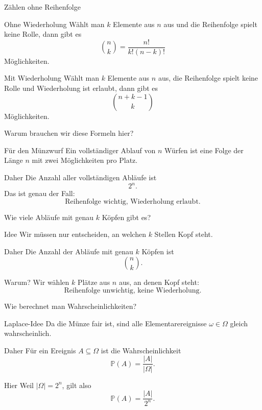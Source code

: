 \documentclass{beamer}
\begin{document}
\begin{frame}{Zählen ohne Reihenfolge}
\begin{block}{Ohne Wiederholung}
Wählt man \(k\) Elemente aus \(n\) aus und die Reihenfolge spielt keine Rolle, dann gibt es
\[
\binom{n}{k}=\frac{n!}{k!(n-k)!}
\]
Möglichkeiten.
\end{block}

\begin{block}{Mit Wiederholung}
Wählt man \(k\) Elemente aus \(n\) aus, die Reihenfolge spielt keine Rolle und Wiederholung ist erlaubt, dann gibt es
\[
\binom{n+k-1}{k}
\]
Möglichkeiten.
\end{block}
\end{frame}

\begin{frame}{Warum brauchen wir diese Formeln hier?}
\begin{block}{Für den Münzwurf}
Ein vollständiger Ablauf von \(n\) Würfen ist eine Folge der Länge \(n\) mit zwei Möglichkeiten pro Platz.
\end{block}

\begin{block}{Daher}
Die Anzahl aller vollständigen Abläufe ist
\[
2^n.
\]
Das ist genau der Fall:
\[
\text{Reihenfolge wichtig, Wiederholung erlaubt.}
\]
\end{block}
\end{frame}

\begin{frame}{Wie viele Abläufe mit genau \(k\) Köpfen gibt es?}
\begin{block}{Idee}
Wir müssen nur entscheiden, an welchen \(k\) Stellen Kopf steht.
\end{block}

\begin{block}{Daher}
Die Anzahl der Abläufe mit genau \(k\) Köpfen ist
\[
\binom{n}{k}.
\]
\end{block}

\begin{block}{Warum?}
Wir wählen \(k\) Plätze aus \(n\) aus, an denen Kopf steht:
\[
\text{Reihenfolge unwichtig, keine Wiederholung.}
\]
\end{block}
\end{frame}

\begin{frame}{Wie berechnet man Wahrscheinlichkeiten?}
\begin{block}{Laplace-Idee}
Da die Münze fair ist, sind alle Elementarereignisse \(\omega\in\Omega\) gleich wahrscheinlich.
\end{block}

\begin{block}{Daher}
Für ein Ereignis \(A\subseteq\Omega\) ist die Wahrscheinlichkeit
\[
\mathbb P(A)=\frac{|A|}{|\Omega|}.
\]
\end{block}

\begin{block}{Hier}
Weil \(|\Omega|=2^n\), gilt also
\[
\mathbb P(A)=\frac{|A|}{2^n}.
\]
\end{block}
\end{frame}
\end{document}
